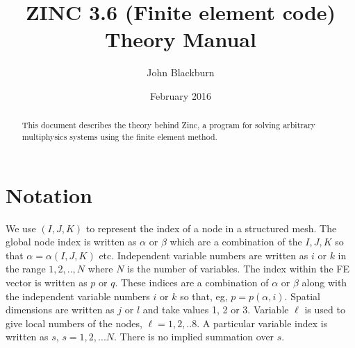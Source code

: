 \documentclass[a4paper]{article}
\begin{document}
\newcommand{\vecc}[1]{\mbox{\boldmath $#1$}}
\renewcommand{\vec}[1]{\mathbf{#1}}
\renewcommand{\d}{\partial}
\renewcommand{\t}[1]{\mathrm{#1}}
\renewcommand{\div}{\nabla\cdot}

\newcommand{\grad}{\nabla}
\newcommand{\curl}{\nabla\times}
\newcommand{\eq}[1]{(\ref{#1})}
\newcommand{\f}[1]{Figure \ref{#1}}
\newcommand{\sect}[1]{Section \ref{#1}}
\newcommand{\dee}{\mathrm{d}}
\newcommand{\dd}[2]{\left(\frac{\d #1}{\d #2}\right)}
\newcommand{\ddd}[3]{\left(\frac{\d #1}{\d #2}\right)_{#3}}
\newcommand{\tensor}[1]{\underline{\underline{#1}}}
\newcommand{\emf}{\mathcal{E}}
\newcommand{\caf}{$\vec C,~\vec a,~\vec f$}
\newcommand{\zinc}{\textsc{Zinc}}
\newcommand{\zpp}{\textsc{Zpp}}
\newcommand{\uv}[1]{{\underline{#1}}}
\newcommand{\var}[1]{\texttt{#1}}


\title{ZINC 3.6 (Finite element code)\\Theory Manual} 

\author{John Blackburn} 
\date{February 2016}
\makecover
\maketitle

\begin{abstract}
This document describes the theory behind Zinc, a program for solving
arbitrary multiphysics systems using the finite element method.
\end{abstract}

\begin{prelude}\tableofcontents\end{prelude}

\section{Notation}
We use $(I,J,K)$ to represent the index of a node in a structured
mesh. The global node index is written as $\alpha$ or $\beta$ which
are a combination of the $I,J,K$ so that $\alpha=\alpha(I,J,K)$
etc. Independent variable numbers are written as $i$ or $k$ in the
range $1,2,..,N$ where $N$ is the number of variables. The index
within the FE vector is written as $p$ or $q$. These indices are a
combination of $\alpha$ or $\beta$ along with the independent variable
numbers $i$ or $k$ so that, eg, $p=p(\alpha,i)$. Spatial dimensions
are written as $j$ or $l$ and take values 1, 2 or 3. Variable $\ell$
is used to give local numbers of the nodes, $\ell=1,2,..8$. A
particular variable index is written as $s$, $s=1,2,...N$. There is no
implied summation over $s$.
\end{document}
